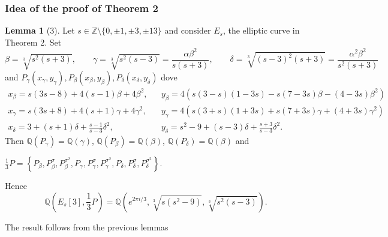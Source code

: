 \documentclass[12pt,handout]{beamer} %
\newcommand{\Q}{\mathbb Q}
\newcommand{\Z}{\mathbb Z}
\theoremstyle{definition}
\newtheorem{lem}{Lemma}
\begin{document}
\begin{frame}
\frametitle{Idea of the proof of Theorem 2}

\begin{lem}[3] Let $s\in\Z\setminus\{0,\pm1,\pm3,\pm13\}$ and consider $E_s$, the elliptic curve in Theorem 2. Set %
$$
\beta=\sqrt[3]{s^2(s+3)},\qquad 
\gamma=\sqrt[3]{s^2(s-3)}=\frac{\alpha\beta^2}{s(s+3)},\qquad  
\delta=\sqrt[3]{(s-3)^2(s+3)}=\frac{\alpha^2\beta^2}{s^2(s+3)} $$\pause
and $P_\gamma(x_\gamma,y_\gamma), P_\beta(x_\beta,y_\beta), P_\delta(x_\delta,y_\delta)$ dove 
\begin{eqnarray*}
x_\beta=s(3s-8)+4(s-1)\beta+4\beta^2,& &y_\beta=4(s(3-s)(1-3s)-s(7-3s)\beta-(4-3s)\beta^2)\\
x_\gamma= s(3s+8)+4(s+1)\gamma+4\gamma^2,& &y_\gamma= 4(s(3+s)(1+3s)+s(7+3s)\gamma+(4 + 3 s)\gamma^2)\\
x_\delta=3+(s+1)\delta+\frac{s-1}{s-3}\delta^2,& &y_\delta=s^2-9+(s-3)\delta+\frac{s+3}{s-3}\delta^2.
\end{eqnarray*}\pause
Then $\Q(P_\gamma)=\Q(\gamma)$, $\Q(P_\beta)=\Q(\beta)$, $\Q(P_\delta)=\Q(\beta)$ and\\
\centerline{$\frac13P=\left\{
P_\beta,P_\beta^\sigma,P_\beta^{\sigma^2},
P_\gamma,P_\gamma^\sigma,P_\gamma^{\sigma^2},
P_\delta,P_\delta^\sigma,P_\delta^{\sigma^2}\right\}.$}\pause
Hence
$$\Q(E_s[3],\frac13P)=\Q(e^{2\pi i/3},\sqrt[3]{s(s^2-9)},\sqrt[3]{s^2(s-3)}).$$
\end{lem}\pause

The result follows from the previous lemmas
\end{frame}
\end{document}
